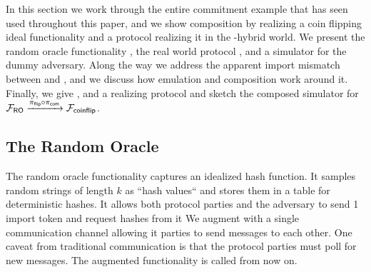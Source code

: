 In this section we work through the entire commitment example that has seen used throughout this paper, and we show composition by realizing a coin flipping ideal functionality \Fflip and a protocol realizing it in the \Fcom-hybrid world.
We present the random oracle functionality \Fro, the real world protocol , and a simulator for the dummy adversary.
Along the way we address the apparent import mismatch between \Fcom and \Fro, and we discuss how emulation and composition work around it.
Finally, we give \Fflip, and a realizing protocol and sketch the composed simulator for $\mathcal{F}_{{\mathsf {RO}}} \xrightarrow{\pi_{{\mathsf {flip}}} \circ \pi_{{\mathsf {com}}}} \mathcal{F}_{{\mathsf {coinflip}}}$.

\subsection{The Random Oracle}
The random oracle functionality captures an idealized hash function. It samples random strings of length $k$ as ``hash values`` and stores them in a table for deterministic hashes.
It allows both protocol parties and the adversary to send 1 import token and request hashes from it
We augment \Fro with a single communication channel allowing it parties to send messages to each other. One caveat from traditional communication
is that the protocol parties must poll \Fro for new messages. The augmented functionality is called \Fropp from now on.

